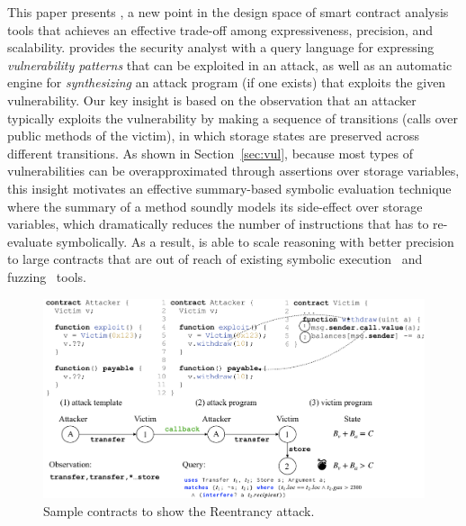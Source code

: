 This paper presents \toolname, a new point in the design space of smart contract analysis tools that achieves an effective trade-off among expressiveness, precision, and scalability. \toolname provides the security analyst with a query language for expressing \emph{vulnerability patterns} 
that can be exploited in an attack, as well as an automatic engine for \emph{synthesizing} an attack program (if one exists) that exploits the given vulnerability. Our key insight is based on the observation that an attacker typically exploits the vulnerability by making a sequence of transitions (calls over public methods of the victim), in which storage states are preserved across different transitions. As shown in Section~\ref{sec:vul}, because most types of vulnerabilities can be overapproximated through assertions over storage variables, this insight motivates an effective summary-based symbolic evaluation technique where the summary of a method soundly models its side-effect over storage variables, which dramatically reduces the number of instructions that \toolname has to re-evaluate symbolically. As a result, \toolname is able to scale reasoning with better precision to large contracts that are out of reach of existing symbolic execution~\cite{teether,oyente} and fuzzing~\cite{contractfuzzer} tools. 
\begin{figure}
  \centering
  \includegraphics[scale=0.4]{motivate.png}
\caption{Sample contracts to show the Reentrancy attack.}
\label{fig:motivate}
\end{figure}
